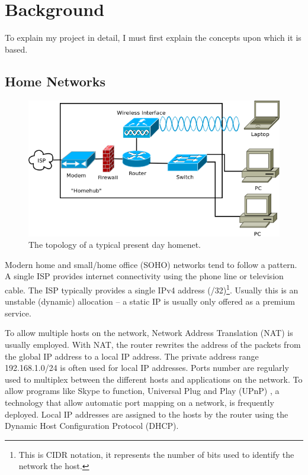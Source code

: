 \documentclass[12pt,a4paper,twoside]{report}
\begin{document}
\chapter{Background}
To explain my project in detail, I must first explain the concepts upon which
it is based.

\section{Home Networks}

\begin{figure}
\begin{center}
  \includegraphics[width=\linewidth]{../Diagrams/Network/TypicalHomenet.png}
	\caption{The topology of a typical present day homenet.}\label{fig:typical_homenet}
\end{center}
\end{figure}

Modern home and small/home office (SOHO)  networks tend to follow a pattern. A single ISP provides internet
connectivity using the phone line or television cable.  The ISP typically
provides a single IPv4 address (/32)\footnote{This is CIDR notation, it
represents the number of bits used to identify the network the host.}. Usually
this is an unstable (dynamic) allocation -- a static IP is usually only offered
as a premium service. 

To allow multiple hosts on the network, Network Address Translation (NAT)
 is usually employed. With NAT,
the router rewrites the address of the packets from the global IP address to a
local IP address. The private address range 192.168.1.0/24 is often used for
local IP addresses. Ports number are regularly used to multiplex between the
different hosts and applications on the network. To allow programs like Skype
to function, Universal Plug and Play (UPnP) , a technology that allow automatic port mapping on a network, is
frequently deployed. Local IP addresses are assigned to the hosts by the router
using the Dynamic Host Configuration Protocol (DHCP). 
\end{document}
